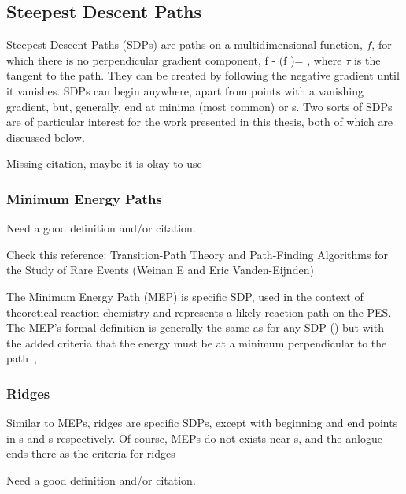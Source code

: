 \subsection{Steepest Descent Paths}
\label{sec:sdps}


Steepest Descent Paths (SDPs) are paths on a multidimensional function, $f$, for which there is no perpendicular gradient component,
\nabla f - (\nabla f \cdot \tau)\tau = ,
\eeq
where $\tau$ is the tangent to the path.
They can be created by following the negative gradient until it vanishes.
SDPs can begin anywhere, apart from points with a vanishing gradient, but, generally, end at minima (most common) or \sap{}s.
Two sorts of SDPs are of particular interest for the work presented in this thesis, both of which are discussed below.

\bit
\item Missing citation, maybe it is okay to use \cite{gradient-extramals-ruedenberg-1993}
\eit

\subsubsection{Minimum Energy Paths}
\label{sec:meps}

\bit
\item Need a good definition and/or citation.
\eit

Check this reference:
Transition-Path Theory and Path-Finding Algorithms for the Study of Rare Events
(Weinan E and Eric Vanden-Eijnden)

The Minimum Energy Path (MEP) is specific SDP, used in the context of theoretical reaction chemistry and represents a likely reaction path on the PES.
The MEP's formal definition is generally the same as for any SDP () but with the added criteria that the energy must be at a minimum perpendicular to the path~\cite{neb-polemic-henkelman1},
\text{\expand}
\eeq

\subsubsection{Ridges}
\label{sec:ridges}

Similar to MEPs, ridges are specific SDPs, except with beginning and end points in s and s respectively.
Of course, MEPs do not exists near s, and the anlogue ends there as the criteria for ridges \expand

\bit
\item Need a good definition and/or citation.
\eit

\placeholder


